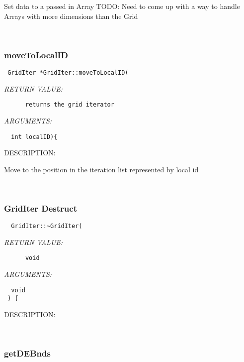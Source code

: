    Set data to a passed in Array
   TODO: Need to come up with a way to handle Arrays with more dimensions than the Grid
   
 
\mbox{}\hrulefill\
 
\subsubsection [moveToLocalID] {moveToLocalID}


  
\begin{verbatim} GridIter *GridIter::moveToLocalID(\end{verbatim}{\em RETURN VALUE:}
\begin{verbatim}      returns the grid iterator\end{verbatim}{\em ARGUMENTS:}
\begin{verbatim}     
  int localID){\end{verbatim}
{\sf DESCRIPTION:\\ }


   Move to the position in the iteration list represented by local id
   
 
\mbox{}\hrulefill\
 
\subsubsection [GridIter] {GridIter Destruct}


  
\begin{verbatim}  GridIter::~GridIter(\end{verbatim}{\em RETURN VALUE:}
\begin{verbatim}      void\end{verbatim}{\em ARGUMENTS:}
\begin{verbatim}  void  
 ) {\end{verbatim}
{\sf DESCRIPTION:\\ }


 
   
 
\mbox{}\hrulefill\
 
\subsubsection [getDEBnds] {getDEBnds}


